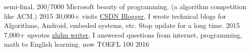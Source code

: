 



\begin{cvhonors}

  \cvhonor
    {semi-final, 200/7000} %
    {Microsoft beauty of programming. (a algorithm competition like ACM.) } %
    { } %
    {2015} %
  \cvhonor
    {30,000+ visits} %
    {\href{http://blog.csdn.net/qq_21970857}{CSDN Blogger},  I wrote technical blogs for Algorithms, Android, embeded systems, etc. 
    Stop update for a long time.} %
    { } %
    {2015} %
  \cvhonor
    {7,000+ upvotes} %
    {\href{https://www.zhihu.com/people/rex686568}{zhihu writer},  I answered questions from internet, programming, math to English learning.} %
    { } %
    {now} %
  \cvhonor
    {TOEFL} %
    {100} %
    { } %
    {2016} %
\end{cvhonors}


